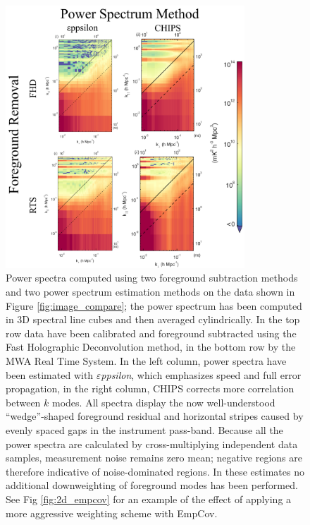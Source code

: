 \documentclass[twolcolumn,iop]{emulateapj}
\def\eppsilon{{\it $\varepsilon$ppsilon}}
\def\empirical{EmpCov}
\begin{document}
\begin{figure}[htbp]
\begin{center}
\includegraphics[width=0.8\textwidth]{figures/MWA_PS_compare/MWA_PS_compare.png}
\caption{Power spectra computed using two foreground subtraction methods and two power spectrum estimation methods on the data shown in Figure \ref{fig:image_compare}; the power spectrum has been computed in 3D spectral line cubes and then averaged cylindrically.  In the top row data have been calibrated and foreground subtracted using the Fast Holographic Deconvolution method, in the bottom row by the MWA Real Time System.  In the left column, power spectra have been estimated with \eppsilon{}, which emphasizes speed and full error propagation, in the right column, CHIPS corrects more correlation between $k$ modes.  All spectra display the now well-understood ``wedge''-shaped foreground residual and horizontal stripes caused by evenly spaced gaps in the instrument pass-band. Because all the power spectra are calculated by cross-multiplying independent data samples, measurement noise remains zero mean; negative regions are therefore indicative of noise-dominated regions. 
In these estimates no additional downweighting of foreground modes has been performed. See Fig   \ref{fig:2d_empcov} for an example of the effect of applying a more aggressive weighting scheme with \empirical{}.
\label{fig:pspec_compare}}
\end{center}
\end{figure}
\end{document}
